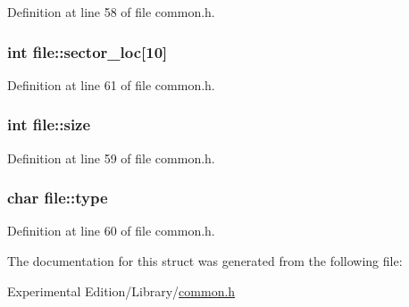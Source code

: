 Definition at line 58 of file common.\+h.

\subsubsection[{\texorpdfstring{sector\+\_\+loc}{sector_loc}}]{\setlength{\rightskip}{0pt plus 5cm}int file\+::sector\+\_\+loc\mbox{[}10\mbox{]}}\hypertarget{structfile_ab4368e129b54f18c028265ad49779e04}{}\label{structfile_ab4368e129b54f18c028265ad49779e04}


Definition at line 61 of file common.\+h.

\subsubsection[{\texorpdfstring{size}{size}}]{\setlength{\rightskip}{0pt plus 5cm}int file\+::size}\hypertarget{structfile_a83a90719edeee627bd6fefe5f8af58ce}{}\label{structfile_a83a90719edeee627bd6fefe5f8af58ce}


Definition at line 59 of file common.\+h.

\subsubsection[{\texorpdfstring{type}{type}}]{\setlength{\rightskip}{0pt plus 5cm}char file\+::type}\hypertarget{structfile_a814f6220d71e264dc20aaaec301d99e7}{}\label{structfile_a814f6220d71e264dc20aaaec301d99e7}


Definition at line 60 of file common.\+h.



The documentation for this struct was generated from the following file\+:\begin{DoxyCompactItemize}
\item 
Experimental Edition/\+Library/\hyperlink{common_8h}{common.\+h}\end{DoxyCompactItemize}
